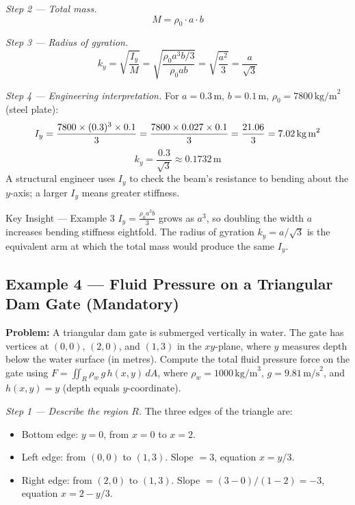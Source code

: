 \documentclass[12pt,a4paper]{article}
\begin{document}
\textit{Step 2 --- Total mass.}
\[
M = \rho_0 \cdot a \cdot b
\]

\textit{Step 3 --- Radius of gyration.}
\[
k_y = \sqrt{\frac{I_y}{M}} = \sqrt{\frac{\rho_0 a^3 b / 3}{\rho_0 ab}} = \sqrt{\frac{a^2}{3}} = \frac{a}{\sqrt{3}}
\]

\textit{Step 4 --- Engineering interpretation.}
For \(a = 0.3\,\text{m}\), \(b = 0.1\,\text{m}\), \(\rho_0 = 7800\,\text{kg/m}^2\) (steel plate):
\[
I_y = \frac{7800 \times (0.3)^3 \times 0.1}{3} = \frac{7800 \times 0.027 \times 0.1}{3} = \frac{21.06}{3} = 7.02\,\text{kg\,m}^2
\]
\[
k_y = \frac{0.3}{\sqrt{3}} \approx 0.1732\,\text{m}
\]
A structural engineer uses \(I_y\) to check the beam's resistance to bending about the \(y\)-axis; a larger \(I_y\) means greater stiffness.

\begin{learnbox}{Key Insight --- Example 3}
\(I_y = \tfrac{\rho_0 a^3 b}{3}\) grows as \(a^3\), so doubling the width \(a\) increases bending stiffness eightfold. The radius of gyration \(k_y = a/\sqrt{3}\) is the equivalent arm at which the total mass would produce the same \(I_y\).
\end{learnbox}

\subsection*{Example 4 --- Fluid Pressure on a Triangular Dam Gate (Mandatory)}

\textbf{Problem:} A triangular dam gate is submerged vertically in water. The gate has vertices at \((0,0)\), \((2,0)\), and \((1,3)\) in the \(xy\)-plane, where \(y\) measures depth below the water surface (in metres). Compute the total fluid pressure force on the gate using \(F = \iint_R \rho_w\,g\,h(x,y)\,dA\), where \(\rho_w = 1000\,\text{kg/m}^3\), \(g = 9.81\,\text{m/s}^2\), and \(h(x,y) = y\) (depth equals \(y\)-coordinate).

\textit{Step 1 --- Describe the region \(R\).}
The three edges of the triangle are:
\begin{itemize}
  \item Bottom edge: \(y = 0\), from \(x = 0\) to \(x = 2\).
  \item Left edge: from \((0,0)\) to \((1,3)\). Slope \(= 3\), equation \(x = y/3\).
  \item Right edge: from \((2,0)\) to \((1,3)\). Slope \(= (3-0)/(1-2) = -3\), equation \(x = 2 - y/3\).
\end{itemize}
\end{document}
